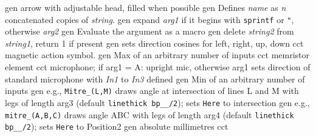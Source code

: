 %
  {gen}%
  {arrow with adjustable head, filled when possible}%
%
  {gen}%
  {Defines {\sl name} as {\sl n} concatenated copies of {\sl
  string}.}%
%
  {gen}%
  {expand {\sl arg1} if it begins
    with {\tt sprintf} or {\tt "}, otherwise {\sl arg2}}%
%
  {gen}%
  {Evaluate the argument as a macro}%
%
  {gen}%
  {delete {\sl string2} from {\sl string1}, return 1 if present}%
%
  {gen}%
  {sets direction cosines for left, right, up, down}%
%
  {cct}%
  {magnetic action symbol.}%
%
  {gen}%
  {Max of an arbitrary number of inputs}%
%
  {cct}%
  {memristor element}%
%
  {cct}%
  {microphone; if arg1 = A: upright mic, otherwise arg1 sets direction
   of standard microphone with {\sl In1} to {\sl In3} defined
   }%
%
  {gen}%
  {Min of an arbitrary number of inputs}%
%
  {gen}%
  {e.g., {\tt Mitre\_(L,M)} draws angle at intersection of lines
   L and M with legs of length arg3 (default {\tt linethick bp\_\_/2});
   sets {\tt Here} to intersection
    }%
%
  {gen}%
  {e.g., {\tt mitre\_(A,B,C)} draws angle ABC with legs
   of length arg4 (default {\tt linethick bp\_\_/2}); sets {\tt Here}
   to Position2
    }%
%
  {gen}%
  {absolute millimetres}%
%
  {cct}%
